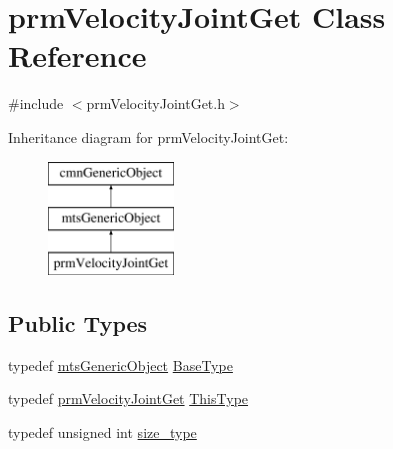 \hypertarget{classprm_velocity_joint_get}{\section{prm\-Velocity\-Joint\-Get Class Reference}
\label{classprm_velocity_joint_get}
}


{\ttfamily \#include $<$prm\-Velocity\-Joint\-Get.\-h$>$}

Inheritance diagram for prm\-Velocity\-Joint\-Get\-:\begin{figure}[H]
\begin{center}
\leavevmode
\includegraphics[height=3.000000cm]{de/d7a/classprm_velocity_joint_get}
\end{center}
\end{figure}
\subsection*{Public Types}
\begin{DoxyCompactItemize}
\item 
typedef \hyperlink{classmts_generic_object}{mts\-Generic\-Object} \hyperlink{classprm_velocity_joint_get_ad043b0f13500d770bef8eca12241e581}{Base\-Type}
\item 
typedef \hyperlink{classprm_velocity_joint_get}{prm\-Velocity\-Joint\-Get} \hyperlink{classprm_velocity_joint_get_a97c1b10ad949296590e6106c69e94d02}{This\-Type}
\item 
typedef unsigned int \hyperlink{classprm_velocity_joint_get_af8a1c509111e5ac2e38dfe32bc6d9914}{size\-\_\-type}
\end{DoxyCompactItemize}
